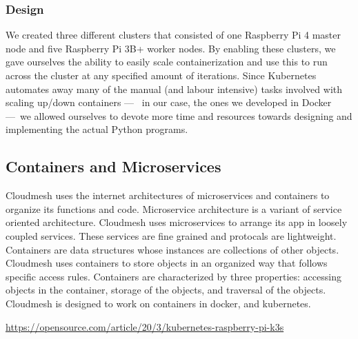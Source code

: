 \subsubsection{Design}
We created three different clusters that consisted of one Raspberry Pi 4 master node and five Raspberry Pi 3B+ worker nodes. By enabling these clusters, we gave ourselves the ability to easily scale containerization and use this to run across the cluster at any specified amount of iterations. Since Kubernetes automates away many of the manual (and labour intensive) tasks involved with scaling up/down containers —  in our case, the ones we developed in Docker — we allowed ourselves to devote more time and resources towards designing and implementing the actual Python programs.




\subsection{Containers and Microservices}
\label{containers-and-microservices}

Cloudmesh uses the internet architectures of microservices and
containers to organize its functions and code. Microservice architecture
is a variant of service oriented architecture. Cloudmesh uses
microservices to arrange its app in loosely coupled services. These
services are fine grained and protocals are lightweight. Containers are
data structures whose instances are collections of other objects.
Cloudmesh uses containers to store objects in an organized way that
follows specific access rules. Containers are characterized by three
properties: accessing objects in the container, storage of the objects,
and traversal of the objects. Cloudmesh is designed to work on
containers in docker, and kubernetes.


 \url{https://opensource.com/article/20/3/kubernetes-raspberry-pi-k3s}
